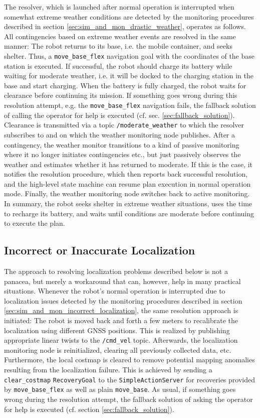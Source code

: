 \documentclass[english, master, utf8]{base/thesis_KBS}
\newcommand{\code}[1]{\colorbox{light-gray}{\texttt{#1}}}
\begin{document}
The resolver, which is launched after normal operation is interrupted when somewhat extreme weather conditions are detected by the monitoring procedures described in section
\ref{sec:sim_and_mon_drastic_weather}, operates as follows. All contingencies based on extreme weather events are resolved in the same manner: The robot returns to its base,
i.e. the mobile container, and seeks shelter. Thus, a \code{move\_base\_flex} navigation goal with the coordinates of the base station is executed. If successful, the robot
should charge its battery while waiting for moderate weather, i.e. it will be docked to the charging station in the base and start charging. When the battery is fully charged,
the robot waits for clearance before continuing its mission. If something goes wrong during this resolution attempt, e.g. the \code{move\_base\_flex} navigation fails, the
fallback solution of calling the operator for help is executed (cf. sec. \ref{sec:fallback_solution}). Clearance is transmitted via a topic \code{/moderate\_weather} to which the
resolver subscribes to and on which the weather monitoring node publishes. After a contingency, the weather monitor transitions to a kind of passive monitoring where it no longer
initiates contingencies etc., but just passively observes the weather and estimates whether it has returned to moderate. If this is the case, it notifies the resolution procedure,
which then reports back successful resolution, and the high-level state machine can resume plan execution in normal operation mode. Finally, the weather monitoring node switches
back to active monitoring. In summary, the robot seeks shelter in extreme weather situations, uses the time to recharge its battery, and waits until conditions are moderate before
continuing to execute the plan.

\subsection{Incorrect or Inaccurate Localization}
\label{sec:localization_resolver}

The approach to resolving localization problems described below is not a panacea, but merely a workaround that can, however, help in many practical situations. Whenever the robot's
normal operation is interrupted due to localization issues detected by the monitoring procedures described in section \ref{sec:sim_and_mon_incorrect_localization}, the same resolution
approach is initiated: The robot is moved back and forth a few meters to recalibrate the localization using different GNSS positions. This is realized by publishing appropriate linear
twists to the \code{/cmd\_vel} topic. Afterwards, the localization monitoring node is reinitialized, clearing all previously collected data, etc. Furthermore, the local costmap is
cleared to remove potential mapping anomalies resulting from the localization failure. This is achieved by sending a \code{clear\_costmap} \code{RecoveryGoal} to the
\code{SimpleActionServer} for recoveries provided by \code{move\_base\_flex} as well as plain \code{move\_base}. As usual, if something goes wrong during the resolution attempt,
the fallback solution of asking the operator for help is executed (cf. section \ref{sec:fallback_solution}).
\end{document}
